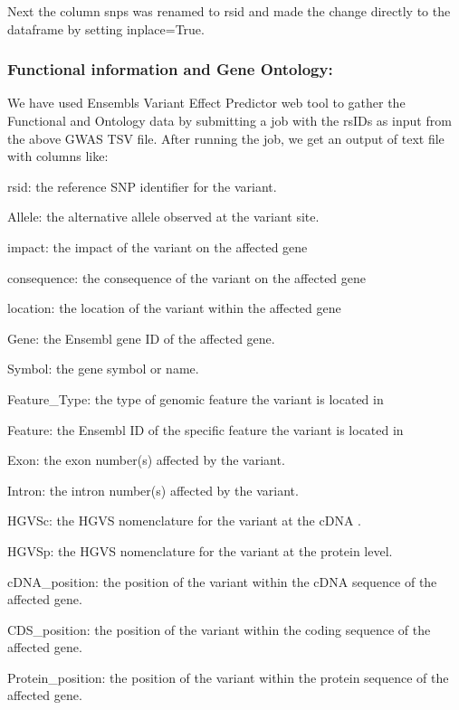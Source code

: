 \documentclass[12pt,a4paper]{article}
\begin{document}
{Next the column \textquotesingle snps\textquotesingle{} was renamed to
\textquotesingle rsid\textquotesingle{} and made the change directly to
the dataframe by setting inplace=True.}

\hypertarget{h.o8avd7mg5nfg}{%
\subsubsection{\texorpdfstring{{Functional information and Gene
Ontology:}}{Functional information and Gene Ontology:}}\label{h.o8avd7mg5nfg}}

{We have used Ensembl\textquotesingle s Variant Effect Predictor web
tool to gather the Functional and Ontology data by submitting a job with
the rsIDs as input from the above GWAS TSV file. After running the job,
we get an output of text file with columns like:}

{rsid: the reference SNP identifier for the variant.}

{Allele: the alternative allele observed at the variant site.}

{impact: the impact of the variant on the affected gene}

{consequence: the consequence of the variant on the affected gene}

{location: the location of the variant within the affected gene}

{Gene: the Ensembl gene ID of the affected gene.}

{Symbol: the gene symbol or name.}

{Feature\_Type: the type of genomic feature the variant is located in}

{Feature: the Ensembl ID of the specific feature the variant is located
in}

{Exon: the exon number(s) affected by the variant.}

{Intron: the intron number(s) affected by the variant.}

{HGVSc: the HGVS nomenclature for the variant at the cDNA .}

{HGVSp: the HGVS nomenclature for the variant at the protein level.}

{cDNA\_position: the position of the variant within the cDNA sequence of
the affected gene.}

{CDS\_position: the position of the variant within the coding sequence
of the affected gene.}

{Protein\_position: the position of the variant within the protein
sequence of the affected gene.}
\end{document}
